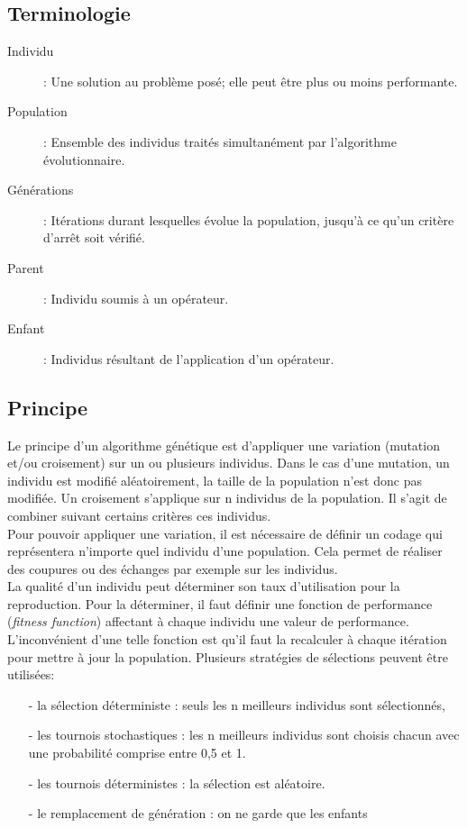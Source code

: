 \subsection{Terminologie \cite{MOP}}

\begin{description}
  \item[Individu]: Une solution au probl\`eme pos\'e; elle peut \^etre plus ou moins performante.
  \item[Population]: Ensemble des individus trait\'es simultan\'ement par l'algorithme \'evolutionnaire.
  \item[G\'en\'erations]: It\'erations durant lesquelles \'evolue la population, jusqu'\`a ce qu'un crit\`ere d'arr\^et soit v\'erifi\'e.
  \item[Parent]: Individu soumis \`a un op\'erateur.
  \item[Enfant]: Individus r\'esultant de l'application d'un op\'erateur.
\end{description}


\subsection{Principe}
Le principe d'un algorithme g\'en\'etique est d'appliquer une variation (mutation et/ou croisement) sur un ou plusieurs individus. Dans le cas d'une mutation, un individu est modifi\'e al\'eatoirement, la taille de la population n'est donc pas modifi\'ee. Un croisement s'applique sur n individus de la population. Il s'agit de combiner suivant certains crit\`eres ces individus.\\
Pour pouvoir appliquer une variation, il est n\'ecessaire de d\'efinir un codage qui repr\'esentera n'importe quel individu d'une population. Cela permet de r\'ealiser des coupures ou des \'echanges par exemple sur les individus.\\

La qualit\'e d'un individu peut d\'eterminer son taux d'utilisation pour la reproduction. Pour la d\'eterminer, il faut d\'efinir une fonction de performance (\textit{fitness function}) affectant \`a chaque individu une valeur de performance. L'inconv\'enient d'une telle fonction est qu'il faut la recalculer \`a chaque it\'eration pour mettre \`a jour la population.
Plusieurs strat\'egies de s\'elections peuvent \^etre utilis\'ees: 
\begin{itemize}
  \item[-] la s\'election d\'eterministe : seuls les n meilleurs individus sont s\'electionn\'es,
  \item[-] les tournois stochastiques : les n meilleurs individus sont choisis chacun avec une probabilit\'e comprise entre 0,5 et 1.
  \item[-] les tournois d\'eterministes : la s\'election est al\'eatoire.
  \item[-] le remplacement de g\'en\'eration : on ne garde que les enfants
\end{itemize}


